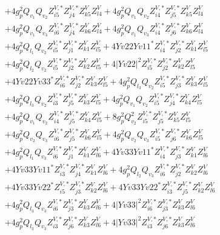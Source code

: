 \begin{align}
 &+4 g_{p}^{2} Q_{v_1} Q_{v_2} Z^{V,*}_{i 5} Z^{V,*}_{j 4} Z_{{k 5}}^{V} Z_{{l 4}}^{V} +4 g_{p}^{2} Q_{v_1} Q_{v_2} Z^{V,*}_{i 4} Z^{V,*}_{j 5} Z_{{k 5}}^{V} Z_{{l 4}}^{V} \nonumber \\ 
 &+4 g_{p}^{2} Q_{v_1} Q_{v_3} Z^{V,*}_{i 6} Z^{V,*}_{j 4} Z_{{k 6}}^{V} Z_{{l 4}}^{V} +4 g_{p}^{2} Q_{v_1} Q_{v_3} Z^{V,*}_{i 4} Z^{V,*}_{j 6} Z_{{k 6}}^{V} Z_{{l 4}}^{V} \nonumber \\ 
 &+4 g_{p}^{2} Q_{l_1} Q_{v_2} Z^{V,*}_{i 5} Z^{V,*}_{j 1} Z_{{k 1}}^{V} Z_{{l 5}}^{V} +4 Yv22 Yv11^* Z^{V,*}_{i 4} Z^{V,*}_{j 2} Z_{{k 1}}^{V} Z_{{l 5}}^{V} \nonumber \\ 
 &+4 g_{p}^{2} Q_{l_2} Q_{v_2} Z^{V,*}_{i 5} Z^{V,*}_{j 2} Z_{{k 2}}^{V} Z_{{l 5}}^{V} +4 |Yv22|^2 Z^{V,*}_{i 5} Z^{V,*}_{j 2} Z_{{k 2}}^{V} Z_{{l 5}}^{V} \nonumber \\ 
 &+4 Yv22 Yv33^* Z^{V,*}_{i 6} Z^{V,*}_{j 2} Z_{{k 3}}^{V} Z_{{l 5}}^{V} +4 g_{p}^{2} Q_{l_3} Q_{v_2} Z^{V,*}_{i 5} Z^{V,*}_{j 3} Z_{{k 3}}^{V} Z_{{l 5}}^{V} \nonumber \\ 
 &+4 g_{p}^{2} Q_{l_3} Q_{v_2} Z^{V,*}_{i 3} Z^{V,*}_{j 5} Z_{{k 3}}^{V} Z_{{l 5}}^{V} +4 g_{p}^{2} Q_{v_1} Q_{v_2} Z^{V,*}_{i 5} Z^{V,*}_{j 4} Z_{{k 4}}^{V} Z_{{l 5}}^{V} \nonumber \\ 
 &+4 g_{p}^{2} Q_{v_1} Q_{v_2} Z^{V,*}_{i 4} Z^{V,*}_{j 5} Z_{{k 4}}^{V} Z_{{l 5}}^{V} +8 g_{p}^{2} Q_{v_2}^{2} Z^{V,*}_{i 5} Z^{V,*}_{j 5} Z_{{k 5}}^{V} Z_{{l 5}}^{V} \nonumber \\ 
 &+4 g_{p}^{2} Q_{v_2} Q_{v_3} Z^{V,*}_{i 6} Z^{V,*}_{j 5} Z_{{k 6}}^{V} Z_{{l 5}}^{V} +4 g_{p}^{2} Q_{v_2} Q_{v_3} Z^{V,*}_{i 5} Z^{V,*}_{j 6} Z_{{k 6}}^{V} Z_{{l 5}}^{V} \nonumber \\ 
 &+4 g_{p}^{2} Q_{l_1} Q_{v_3} Z^{V,*}_{i 6} Z^{V,*}_{j 1} Z_{{k 1}}^{V} Z_{{l 6}}^{V} +4 Yv33 Yv11^* Z^{V,*}_{i 4} Z^{V,*}_{j 3} Z_{{k 1}}^{V} Z_{{l 6}}^{V} \nonumber \\ 
 &+4 Yv33 Yv11^* Z^{V,*}_{i 3} Z^{V,*}_{j 4} Z_{{k 1}}^{V} Z_{{l 6}}^{V} +4 g_{p}^{2} Q_{l_2} Q_{v_3} Z^{V,*}_{i 6} Z^{V,*}_{j 2} Z_{{k 2}}^{V} Z_{{l 6}}^{V} \nonumber \\ 
 &+4 Yv33 Yv22^* Z^{V,*}_{i 5} Z^{V,*}_{j 3} Z_{{k 2}}^{V} Z_{{l 6}}^{V} +4 Yv33 Yv22^* Z^{V,*}_{i 3} Z^{V,*}_{j 5} Z_{{k 2}}^{V} Z_{{l 6}}^{V} \nonumber \\ 
 &+4 g_{p}^{2} Q_{l_3} Q_{v_3} Z^{V,*}_{i 6} Z^{V,*}_{j 3} Z_{{k 3}}^{V} Z_{{l 6}}^{V} +4 |Yv33|^2 Z^{V,*}_{i 6} Z^{V,*}_{j 3} Z_{{k 3}}^{V} Z_{{l 6}}^{V} \nonumber \\ 
 &+4 g_{p}^{2} Q_{l_3} Q_{v_3} Z^{V,*}_{i 3} Z^{V,*}_{j 6} Z_{{k 3}}^{V} Z_{{l 6}}^{V} +4 |Yv33|^2 Z^{V,*}_{i 3} Z^{V,*}_{j 6} Z_{{k 3}}^{V} Z_{{l 6}}^{V} \nonumber \\ 

\end{align}

